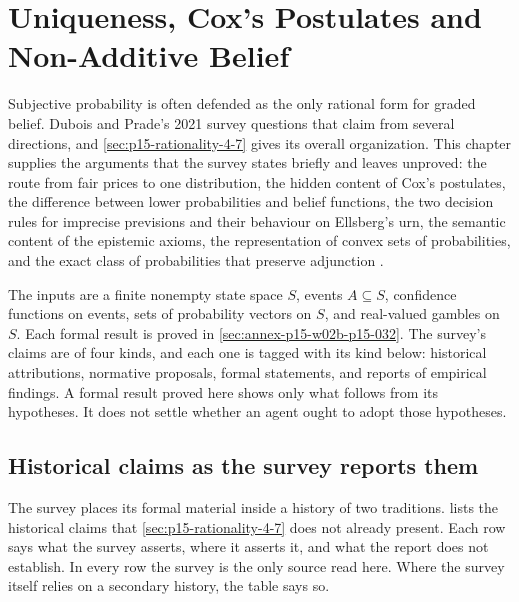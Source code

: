\chapter{Uniqueness, Cox's Postulates and Non-Additive Belief}
\label{sec:p15-w02b-p15-032}

Subjective probability is often defended as the only rational form for
graded belief. Dubois and Prade's 2021 survey questions that claim from
several directions, and \cref{sec:p15-rationality-4-7} gives its overall
organization. This chapter supplies the arguments that the survey states
briefly and leaves unproved: the route from fair prices to one distribution,
the hidden content of Cox's postulates, the difference between lower
probabilities and belief functions, the two decision rules for imprecise
previsions and their behaviour on Ellsberg's urn, the semantic content of
the epistemic axioms, the representation of convex sets of probabilities,
and the exact class of probabilities that preserve adjunction
\cite[pp.~305--316]{DuboisPrade2021RepresentingBelief}.

The inputs are a finite nonempty state space \(S\), events \(A\subseteq S\),
confidence functions on events, sets of probability vectors on \(S\), and
real-valued gambles on \(S\). Each formal result is proved in
\cref{sec:annex-p15-w02b-p15-032}. The survey's claims are of four kinds,
and each one is tagged with its kind below: historical attributions, normative
proposals, formal statements, and reports of empirical findings. A formal
result proved here shows only what follows from its hypotheses. It does
not settle whether an agent ought to adopt those hypotheses.

\section{Historical claims as the survey reports them}
\label{sec:p15-w02b-p15-032-history}

The survey places its formal material inside a history of two traditions.
 lists the historical claims that
\cref{sec:p15-rationality-4-7} does not already present. Each row says what
the survey asserts, where it asserts it, and what the report does not
establish. In every row the survey is the only source read here. Where the
survey itself relies on a secondary history, the table says so.

